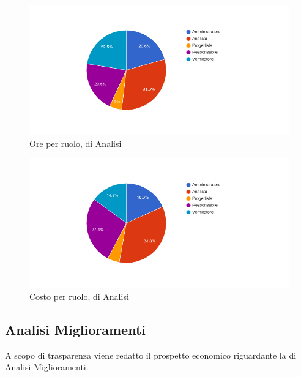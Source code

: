 \begin{figure}[H]
  \begin{center}
    \includegraphics[width=15cm]{res/img/prospettoEconomico/orePerRuoloAnalisi.png}
  \caption{Ore per ruolo,  di Analisi}
  \end{center} 
\end{figure}  

\begin{figure}[H]
  \begin{center}
    \includegraphics[width=15cm]{res/img/prospettoEconomico/costoPerRuoloAnalisi.png}
  \caption{Costo per ruolo,  di Analisi}
  \end{center} 
\end{figure}  


\subsection{Analisi Miglioramenti}
A scopo di trasparenza viene redatto il prospetto economico riguardante la  di Analisi Miglioramenti.

